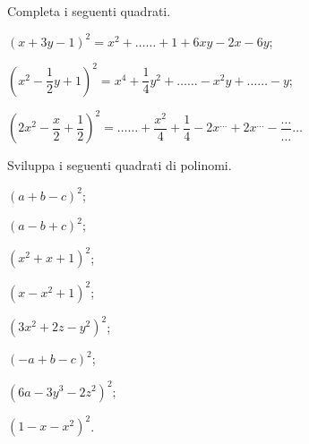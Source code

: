 \begin{esercizio}
 \label{ese:12.11}
Completa i seguenti quadrati.

\begin{enumeratea}
\spazielenx
\item $\left(x+3y-1\right)^{2}=x^{2}+\ldots \ldots +1+6xy-2x-6y$;
\item $\left(x^{2}-\dfrac{1}{2}y+1\right)^{2}=x^{4}+\dfrac{1}{4}y^{2}+\ldots\ldots -x^{2}y+\ldots\ldots -y$;
\item $\left(2x^{2}-\dfrac{x}{2}+\dfrac{1}{2}\right)^{2}=\ldots\ldots +\dfrac{x^{2}}{4}%
+\dfrac{1}{4}-2x^{\ldots }+2x^{\ldots}-\dfrac{\ldots}{\ldots}\ldots $
\end{enumeratea}
\end{esercizio}
\pagebreak
\begin{esercizio}
 \label{ese:12.12}
Sviluppa i seguenti quadrati di polinomi.
\begin{multicols}{2}
\begin{enumeratea}
\item $\left(a+b-c\right)^{2}$;
\item $\left(a-b+c\right)^{2}$;
\item $\left(x^{2}+x+1\right)^{2}$;
\item $\left(x-x^{2}+1\right)^{2}$;
\item $\left(3x^{2}+2z-y^{2}\right)^{2}$;
\item $\left(-a+b-c\right)^{2}$;
\item $\left(6a-3y^{3}-2z^{2}\right)^{2}$;
\item $\left(1-x-x^{2}\right)^{2}$.
\end{enumeratea}
\end{multicols}
\end{esercizio}

